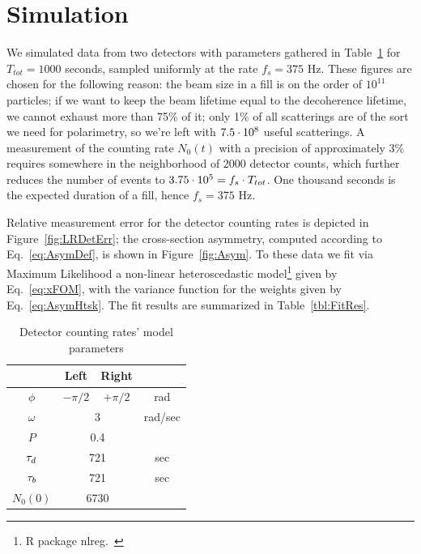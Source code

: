 \documentclass{article}
\begin{document}
\section{Simulation}
We simulated data from two detectors with parameters gathered in Table~\ref{tbl:DetCntRtParam} for $T_{tot}=1000$ seconds, sampled uniformly at the rate $f_s = 375$ Hz. These figures are chosen for the following reason: the beam size in a fill is on the order of $10^{11}$ particles; if we want to keep the beam lifetime equal to the decoherence lifetime, we cannot exhaust more than 75\% of it; only 1\% of all scatterings are of the sort we need for polarimetry, so we're left with ${7.5}\cdot 10^{8}$ useful scatterings. A measurement of the counting rate $N_0(t)$ with a precision of approximately 3\% requires somewhere in the neighborhood of 2000 detector counts, which further reduces the number of events to ${3.75}\cdot 10^{5}= f_s\cdot T_{tot}$. One thousand seconds is the expected duration of a fill, hence $f_s = 375$ Hz. 

Relative measurement error for the detector counting rates is depicted in Figure~\ref{fig:LRDetErr}; the cross-section asymmetry, computed according to Eq.~\eqref{eq:AsymDef}, is shown in Figure~\ref{fig:Asym}.
To these data we fit via Maximum Likelihood a non-linear heteroscedastic model\footnote{R package nlreg.~\cite{NLREG}} given by Eq.~\eqref{eq:xFOM}, with the variance function for the weights given by Eq.~\eqref{eq:AsymHtsk}. The fit results are summarized in Table~\ref{tbl:FitRes}.
\begin{table}[h]
	\centering
	\caption{Detector counting rates' model parameters\label{tbl:DetCntRtParam}}
	\begin{tabular}{cccc}
		\hline
		         &   Left   &     Right     &  \\ \hline
		 $\phi$  & $-\pi/2$ &   $+\pi/2$    &   rad   \\
		$\omega$ &  \multicolumn{2}{c}{3}   & rad/sec \\
		  $P$    & \multicolumn{2}{c}{0.4}  &  \\
		 $\tau_d$  & \multicolumn{2}{c}{721}  &   sec   \\
		 $\tau_b$  & \multicolumn{2}{c}{721}  &   sec   \\
		$N_0(0)$ & \multicolumn{2}{c}{6730} &  \\ \hline
	\end{tabular}
\end{table}
\end{document}
